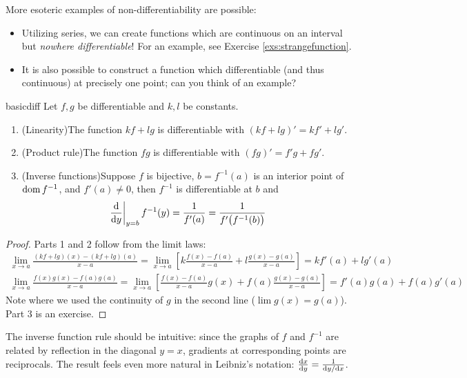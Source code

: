 More esoteric examples of non-differentiability are possible:
\begin{itemize}
  \item Utilizing series, we can create functions which are continuous on an interval but \emph{nowhere differentiable}! For an example, see Exercise \ref{exs:strangefunction}.
  \item It is also possible to construct a function which differentiable (and thus continuous) at precisely one point; can you think of an example?
\end{itemize}

\goodbreak


	
\begin{thm}{}{basicdiff}
	Let $f,g$ be differentiable and $k,l$ be constants.
	\begin{enumerate}
	  \item (Linearity)\quad The function $kf+lg$ is differentiable with $(kf+lg)'=kf'+lg'$.
	  \item (Product rule)\quad The function $fg$ is differentiable with $(fg)'=f' g+fg'$.
	  \item (Inverse functions)\quad Suppose $f$ is bijective, $b=f^{-1}(a)$ is an interior point of $\dom f^{-1}$, and $f'(a)\neq 0$, then $f^{-1}$ is differentiable at $b$ and
		\[
			\diffat y{y=b} f^{-1}(y)=\frac 1{f'(a)}=\frac 1{f'\big(f^{-1}(b)\big)}
		\] 
	\end{enumerate}
\end{thm}

\begin{proof}
	Parts 1 and 2 follow from the limit laws:
	\begin{gather*}
		\lim_{x\to a}\frac{(kf+lg)(x)-(kf+lg)(a)}{x-a}=\lim_{x\to a}\left[k\frac{f(x)-f(a)}{x-a}+l\frac{g(x)-g(a)}{x-a}\right]=kf'(a)+lg'(a)\\
		\lim_{x\to a}\frac{f(x)g(x)-f(a)g(a)}{x-a}=\lim_{x\to a}\left[\frac{f(x)-f(a)}{x-a}g(x)+f(a)\frac{g(x)-g(a)}{x-a}\right]=f'(a)g(a)+f(a)g'(a)
	\end{gather*}
	Note where we used the continuity of $g$ in the second line ($\lim g(x)=g(a)$). Part 3 is an exercise.
\end{proof}

The inverse function rule should be intuitive: since the graphs of $f$ and $f^{-1}$ are related by reflection in the diagonal $y=x$, gradients at corresponding points are reciprocals. The result feels even more natural in Leibniz's notation: $\diff[x]{y}=\frac 1{\dy/\dx}$.

